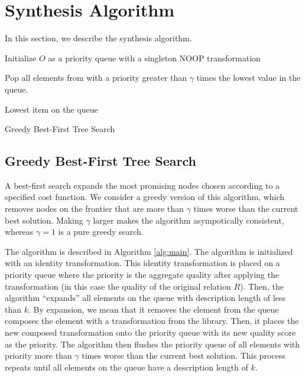 \section{Synthesis Algorithm}
In this section, we describe the synthesis algorithm.

\begin{algorithm}[t]

Initialize $O$ as a priority queue with a singleton NOOP transformation\\

{
    
    Pop all elements from with a priority greater than $\gamma$ times the lowest value in the queue.
}

\Return Lowest item on the queue
\caption{Greedy Best-First Tree Search}
\label{alg:main}
\end{algorithm}


\subsection{Greedy Best-First Tree Search}
A best-first search expands the most promising nodes chosen according to a specified cost function.
We consider a greedy version of this algorithm, which removes nodes on the frontier that are more than $\gamma$ times worse than the current best solution.
Making $\gamma$ larger makes the algorithm asympotically consistent, whereas $\gamma=1$ is a pure greedy search.

The algorithm is described in Algorithm \ref{alg:main}.
The algorithm is initialized with an identity transformation. This identity transformation is placed on a priority queue where the priority is the aggregate quality after applying the transformation (in this case the quality of the original relation $R$).
Then, the algorithm ``expands'' all elements on the queue with description length of less than $k$.
By expansion, we mean that it removes the element from the queue composes the element with a transformation from the library.
Then, it places the new composed transformation onto the priority queue with its new quality score as the priority.
The algorithm then flushes the priority queue of all elements with priority more than $\gamma$ times worse than the current best solution.
This process repeats until all elements on the queue have a description length of $k$.

